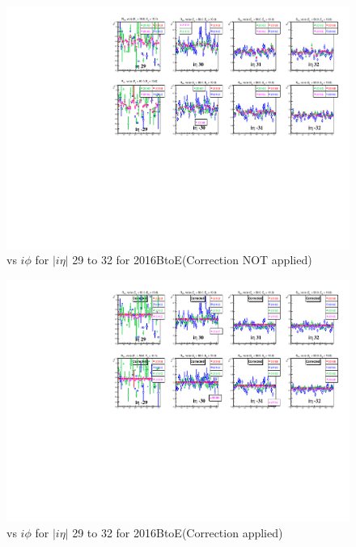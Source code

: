 \clearpage
\begin{figure}[h!]
\centering
\includegraphics[width=0.99\linewidth]{../Figures/Chap2/ImageFiles_HF/Ratio/2016/Corrected/2016BtoE/ieta29_32_E1E2Cut3Ietaiphi}
\caption{\ratiosl vs $i\phi$ for $|i\eta|$ 29 to 32 for 2016BtoE(Correction NOT applied)}
\label{fig:ieta29_32_E1E2Cut3IetaiphiBtoE}
\end{figure}
\begin{figure}[h!]
\centering
\includegraphics[width=0.99\linewidth]{../Figures/Chap2/ImageFiles_HF/Ratio/2016/Corrected/2016BtoE/ieta29_32_E1E2Cut3Ietaiphi_Crrtd}
\caption{\ratiosl vs $i\phi$ for $|i\eta|$ 29 to 32 for 2016BtoE(Correction applied)}
\label{fig:ieta29_32_E1E2Cut3Ietaiphi_CrrtdBtoE}
\end{figure}
